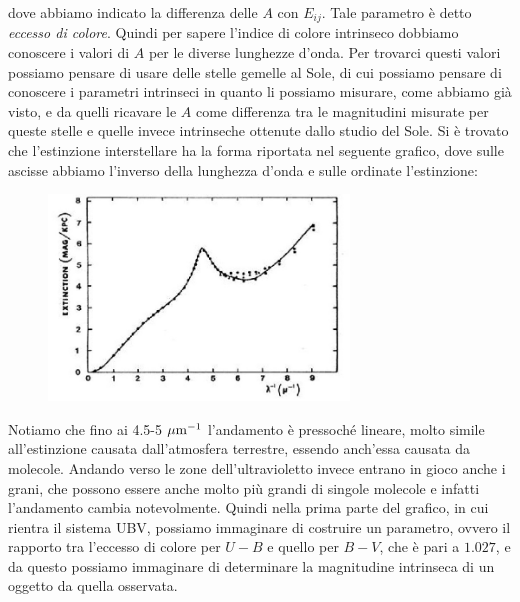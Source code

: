 dove abbiamo indicato la differenza delle $A$ con $E_{ij}$. Tale parametro è detto \textit{eccesso di colore}. %
Quindi per sapere l'indice di colore intrinseco dobbiamo conoscere i valori di $A$ per le diverse lunghezze d'onda. Per trovarci questi valori possiamo pensare di usare delle stelle gemelle al Sole, di cui possiamo pensare di conoscere i parametri intrinseci in quanto li possiamo misurare, come abbiamo già visto, e da quelli ricavare le $A$ come differenza tra le magnitudini misurate per queste stelle e quelle invece intrinseche ottenute dallo studio del Sole. Si è trovato che l'estinzione interstellare ha la forma riportata nel seguente grafico, dove sulle ascisse abbiamo l'inverso della lunghezza d'onda e sulle ordinate l'estinzione:

\begin{figure}[H]
   \centering
   \includegraphics[width=8cm]{estinzione interstellare.jpg}
   \label{fig:esti inter}
\end{figure}

Notiamo che fino ai 4.5-5 $\rm \mu m^{-1}$ l'andamento è pressoché lineare, molto simile all'estinzione causata dall'atmosfera terrestre, essendo anch'essa causata da molecole. Andando verso le zone dell'ultravioletto invece entrano in gioco anche i grani, che possono essere anche molto più grandi di singole molecole e infatti l'andamento cambia notevolmente. Quindi nella prima parte del grafico, in cui rientra il sistema UBV, possiamo immaginare di costruire un parametro, ovvero il rapporto tra l'eccesso di colore per $U-B$ e quello per $B-V$, che è pari a $1.027$, e da questo possiamo immaginare di determinare la magnitudine intrinseca di un oggetto da quella osservata.

